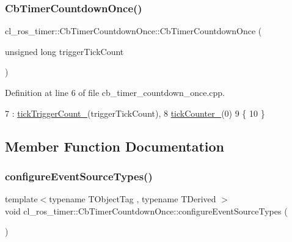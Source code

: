 \subsubsection{\texorpdfstring{Cb\+Timer\+Countdown\+Once()}{CbTimerCountdownOnce()}}
{\footnotesize\ttfamily cl\+\_\+ros\+\_\+timer\+::\+Cb\+Timer\+Countdown\+Once\+::\+Cb\+Timer\+Countdown\+Once (\begin{DoxyParamCaption}\item[{unsigned long}]{trigger\+Tick\+Count }\end{DoxyParamCaption})}



Definition at line 6 of file cb\+\_\+timer\+\_\+countdown\+\_\+once.\+cpp.


\begin{DoxyCode}
7     : \hyperlink{classcl__ros__timer_1_1CbTimerCountdownOnce_aa3ab9c795f42141990ca69749a1ec010}{tickTriggerCount\_}(triggerTickCount),
8       \hyperlink{classcl__ros__timer_1_1CbTimerCountdownOnce_aea7372342782a0b6a1ba50b07ccb0962}{tickCounter\_}(0)
9 \{
10 \}
\end{DoxyCode}


\subsection{Member Function Documentation}
\mbox{\label{classcl__ros__timer_1_1CbTimerCountdownOnce_a12c63ab8ca0d90859f6b7fc1212b504e}} 
\subsubsection{\texorpdfstring{configure\+Event\+Source\+Types()}{configureEventSourceTypes()}}
{\footnotesize\ttfamily template$<$typename T\+Object\+Tag , typename T\+Derived $>$ \\
void cl\+\_\+ros\+\_\+timer\+::\+Cb\+Timer\+Countdown\+Once\+::configure\+Event\+Source\+Types (\begin{DoxyParamCaption}{ }\end{DoxyParamCaption})\hspace{0.3cm}{\ttfamily [inline]}}




